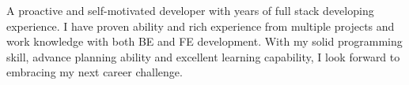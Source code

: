 %
%
%
\par{
A proactive and self-motivated developer with years of full stack developing experience. I have proven ability and rich experience from multiple projects and work knowledge with both BE and FE development. With my solid programming skill, advance planning ability and excellent learning capability, I look forward to embracing my next career challenge.
}